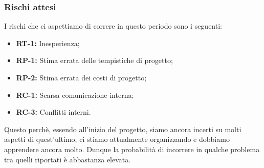 \documentclass[8pt]{article}
\begin{document}
\subsubsection{Rischi attesi}
I rischi che ci aspettiamo di correre in questo periodo sono i seguenti: 
\begin{itemize}
\setlength{\itemsep}{0em}
\item \textbf{RT-1:} Inesperienza;
\item \textbf{RP-1:} Stima errata delle tempistiche di progetto;
\item \textbf{RP-2:} Stima errata dei costi di progetto;
\item \textbf{RC-1:} Scarsa comunicazione interna;
\item \textbf{RC-3:} Conflitti interni.
\end{itemize}
Questo perchè, essendo all'inizio del progetto, siamo ancora incerti su molti aspetti di
quest'ultimo, ci stiamo attualmente organizzando e dobbiamo apprendere ancora molto. Dunque la
probabilità di incorrere in qualche problema tra quelli riportati è abbastanza elevata.
\newpage
\end{document}
